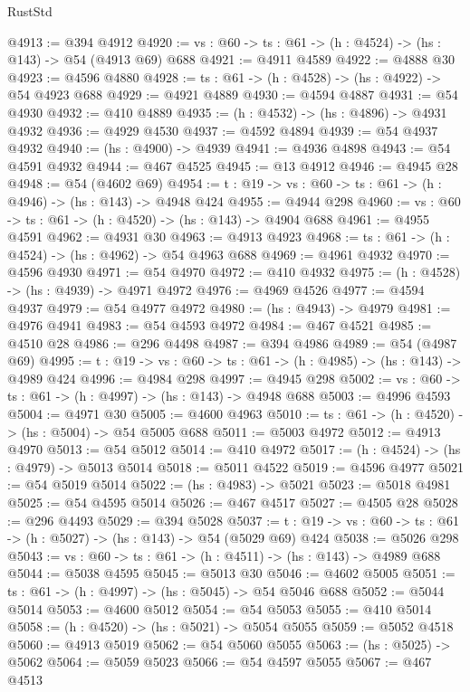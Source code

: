 \begin{lexlean}{RustStd}
\begin{coremodule}
@4913 := @394 @4912
@4920 := {vs : @60} -> {ts : @61} -> (h : @4524) -> (hs : @143) -> @54 (@4913 @69) @688
@4921 := @4911 @4589
@4922 := @4888 @30
@4923 := @4596 @4880
@4928 := {ts : @61} -> (h : @4528) -> (hs : @4922) -> @54 @4923 @688
@4929 := @4921 @4889
@4930 := @4594 @4887
@4931 := @54 @4930
@4932 := @410 @4889
@4935 := (h : @4532) -> (hs : @4896) -> @4931 @4932
@4936 := @4929 @4530
@4937 := @4592 @4894
@4939 := @54 @4937 @4932
@4940 := (hs : @4900) -> @4939
@4941 := @4936 @4898
@4943 := @54 @4591 @4932
@4944 := @467 @4525
@4945 := @13 @4912
@4946 := @4945 @28
@4948 := @54 (@4602 @69)
@4954 := {t : @19} -> {vs : @60} -> {ts : @61} -> (h : @4946) -> (hs : @143) -> @4948 @424
@4955 := @4944 @298
@4960 := {vs : @60} -> {ts : @61} -> (h : @4520) -> (hs : @143) -> @4904 @688
@4961 := @4955 @4591
@4962 := @4931 @30
@4963 := @4913 @4923
@4968 := {ts : @61} -> (h : @4524) -> (hs : @4962) -> @54 @4963 @688
@4969 := @4961 @4932
@4970 := @4596 @4930
@4971 := @54 @4970
@4972 := @410 @4932
@4975 := (h : @4528) -> (hs : @4939) -> @4971 @4972
@4976 := @4969 @4526
@4977 := @4594 @4937
@4979 := @54 @4977 @4972
@4980 := (hs : @4943) -> @4979
@4981 := @4976 @4941
@4983 := @54 @4593 @4972
@4984 := @467 @4521
@4985 := @4510 @28
@4986 := @296 @4498
@4987 := @394 @4986
@4989 := @54 (@4987 @69)
@4995 := {t : @19} -> {vs : @60} -> {ts : @61} -> (h : @4985) -> (hs : @143) -> @4989 @424
@4996 := @4984 @298
@4997 := @4945 @298
@5002 := {vs : @60} -> {ts : @61} -> (h : @4997) -> (hs : @143) -> @4948 @688
@5003 := @4996 @4593
@5004 := @4971 @30
@5005 := @4600 @4963
@5010 := {ts : @61} -> (h : @4520) -> (hs : @5004) -> @54 @5005 @688
@5011 := @5003 @4972
@5012 := @4913 @4970
@5013 := @54 @5012
@5014 := @410 @4972
@5017 := (h : @4524) -> (hs : @4979) -> @5013 @5014
@5018 := @5011 @4522
@5019 := @4596 @4977
@5021 := @54 @5019 @5014
@5022 := (hs : @4983) -> @5021
@5023 := @5018 @4981
@5025 := @54 @4595 @5014
@5026 := @467 @4517
@5027 := @4505 @28
@5028 := @296 @4493
@5029 := @394 @5028
@5037 := {t : @19} -> {vs : @60} -> {ts : @61} -> (h : @5027) -> (hs : @143) -> @54 (@5029 @69) @424
@5038 := @5026 @298
@5043 := {vs : @60} -> {ts : @61} -> (h : @4511) -> (hs : @143) -> @4989 @688
@5044 := @5038 @4595
@5045 := @5013 @30
@5046 := @4602 @5005
@5051 := {ts : @61} -> (h : @4997) -> (hs : @5045) -> @54 @5046 @688
@5052 := @5044 @5014
@5053 := @4600 @5012
@5054 := @54 @5053
@5055 := @410 @5014
@5058 := (h : @4520) -> (hs : @5021) -> @5054 @5055
@5059 := @5052 @4518
@5060 := @4913 @5019
@5062 := @54 @5060 @5055
@5063 := (hs : @5025) -> @5062
@5064 := @5059 @5023
@5066 := @54 @4597 @5055
@5067 := @467 @4513

\end{coremodule}
\end{lexlean}
